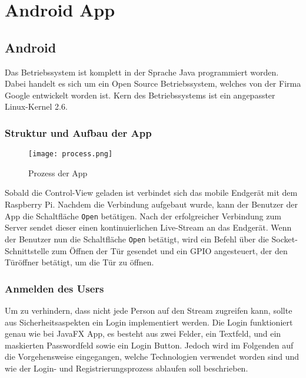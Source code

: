 
\chapter{Android App}
\section{Android}
Das Betriebssystem ist komplett in der Sprache Java programmiert worden. Dabei handelt es sich um ein Open Source Betriebssystem, welches von der Firma Google entwickelt worden ist. Kern des Betriebssystems ist ein angepasster Linux-Kernel 2.6. 
\subsection{Struktur und Aufbau der App}

\begin{figure}[h]
  \begin{center}
    \texttt{[image: process.png]}
  		  \caption{Prozess der App}
     \label{fig.Prozess}
  \end{center}
\end{figure}
Sobald die Control-View geladen ist verbindet sich das mobile Endgerät mit dem Raspberry Pi. Nachdem die Verbindung aufgebaut wurde, kann der Benutzer der App die Schaltfläche \texttt{Open} betätigen. Nach der erfolgreicher Verbindung zum Server sendet dieser einen kontinuierlichen Live-Stream an das Endgerät. Wenn der Benutzer nun die Schaltfläche \texttt{Open} betätigt, wird ein Befehl über die Socket-Schnittstelle zum Öffnen der Tür gesendet und ein GPIO angesteuert, der den Türöffner betätigt, um die Tür zu öffnen.

\subsection{Anmelden des Users}
Um zu verhindern, dass nicht jede Person auf den Stream zugreifen kann, sollte aus Sicherheitsaspekten ein Login implementiert werden. Die Login funktioniert genau wie bei JavaFX App, es besteht aus zwei Felder, ein Textfeld, und ein maskierten Passwordfeld sowie ein Login Button.
Jedoch wird im Folgenden auf die Vorgehensweise eingegangen, welche Technologien verwendet worden sind und wie der Login- und Registrierungsprozess ablaufen soll beschrieben.

